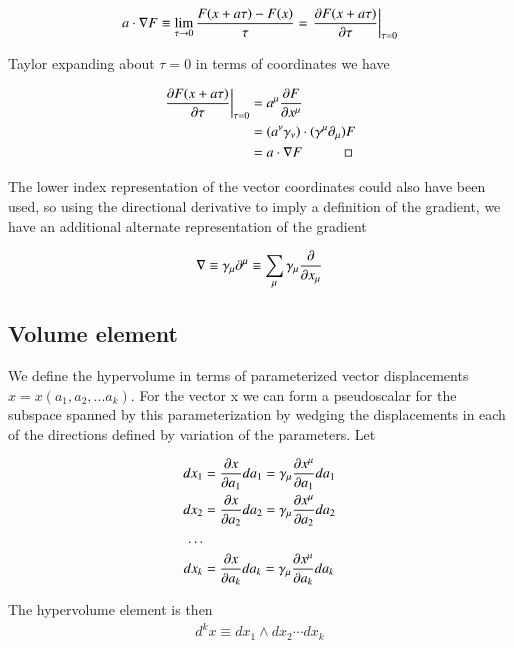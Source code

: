 \begin{align}
a \cdot \grad F \equiv \lim_{\tau \rightarrow 0} \frac{F(x + a\tau) - F(x)}{\tau} = {\left.\PD{\tau}{F(x + a\tau)} \right\vert}_{\tau=0}
\end{align}

Taylor expanding about $\tau=0$ in terms of coordinates we have

\begin{align*}
{\left.\PD{\tau}{F(x + a\tau)} \right\vert}_{\tau=0}
&= a^\mu \PD{x^\mu}{F} \\
&= (a^\nu \gamma_\nu) \cdot (\gamma^\mu \partial_\mu) F \\
&= a \cdot \grad F \quad\quad\quad\square
\end{align*}

The lower index representation of the vector coordinates could also have been used, so using the directional derivative to imply a definition of the gradient, we have an additional alternate representation of the gradient

\begin{align}
\grad \equiv \gamma_\mu \partial^\mu \equiv \sum_\mu \gamma_\mu \PD{x_\mu}{}
\end{align}

\subsection{Volume element}
We define the hypervolume in terms of parameterized vector displacements $x = x(a_1, a_2, ... a_k)$.  For the vector x we can form a pseudoscalar for the subspace spanned by this parameterization by wedging the displacements in each of the directions defined by variation of the parameters.  Let

\begin{align*}
dx_1 & = \PD{a_1}{x} da_1 = \gamma_\mu \PD{a_1}{x^\mu} da_1 \\
dx_2 & = \PD{a_2}{x} da_2 = \gamma_\mu \PD{a_2}{x^\mu} da_2 \\
\hdots \\
dx_k & = \PD{a_k}{x} da_k = \gamma_\mu \PD{a_k}{x^\mu} da_k \\
\end{align*}

The hypervolume element is then
\begin{align}
d^k x \equiv dx_1 \wedge dx_2 \cdots dx_k
\end{align}

